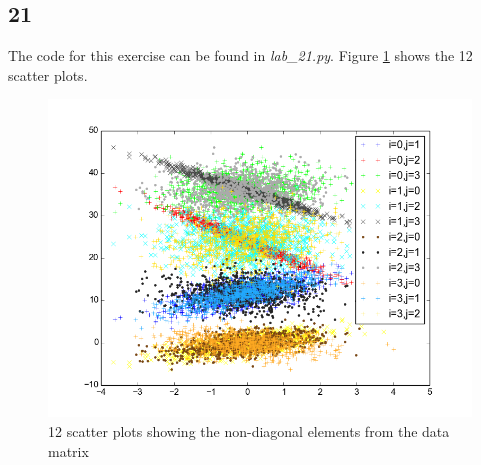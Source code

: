 \documentclass[a4paper,12px]{article}
\begin{document}
\subsection{21}
The code for this exercise can be found in \textit{lab\_21.py}. Figure \ref{fig:21}
 shows the 12 scatter plots.
\begin{figure}
    \centering
    \includegraphics[width=1\textwidth]{fig21.png}
    \caption{12 scatter plots showing the non-diagonal elements from the data matrix}
    \label{fig:21}
\end{figure}
\FloatBarrier
\end{document}
